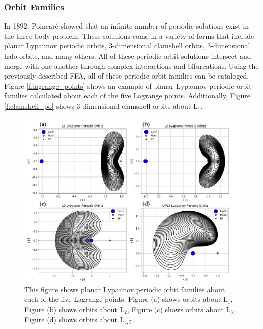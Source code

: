 \documentclass[11pt]{article} %
\begin{document}
\subsubsection{Orbit Families}
In 1892, Poincar\'{e} showed that an infinite number of periodic solutions exist in the three-body problem. These solutions come in a variety of forms that include planar Lypaunov periodic orbits, 3-dimensional clamshell orbits, 3-dimensional halo orbits, and many others. All of these periodic orbit solutions intersect and merge with one another through complex interactions and bifurcations. Using the previously described FFA, all of these periodic orbit families can be cataloged. Figure \ref{f:lagrange_points} shows an example of planar Lypaunov periodic orbit families calculated about each of the five Lagrange points. Additionally, Figure \ref{f:clamshell_po} shows 3-dimensional clamshell orbits about L$_1$. 

\begin{figure}[H]
    \centering
    \includegraphics[width=\textwidth]{lyapunov_po_comb.png}
    \caption{This figure shows planar Lypaunov periodic orbit families about each of the five Lagrange points. Figure (a) shows orbits about L$_1$, Figure (b) shows orbits about L$_2$, Figure (c) shows orbits about L$_3$, Figure (d) shows orbits about L$_{4,5}$.}
    \label{f:lyapunov_po}
\end{figure}
\end{document}
